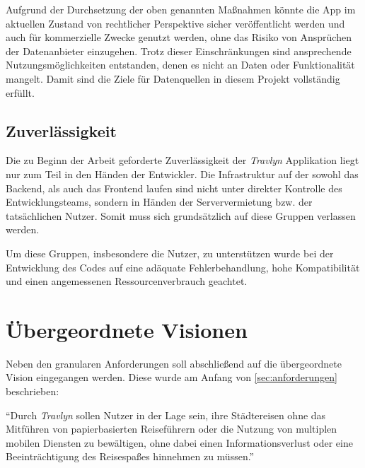 	\vspace{0.25cm}
	
	Aufgrund der Durchsetzung der oben genannten Maßnahmen könnte die App im aktuellen Zustand von rechtlicher Perspektive sicher veröffentlicht werden und auch für kommerzielle Zwecke genutzt werden, ohne das Risiko von Ansprüchen der Datenanbieter einzugehen. Trotz dieser Einschränkungen sind ansprechende Nutzungsmöglichkeiten entstanden, denen es nicht an Daten oder Funktionalität mangelt. Damit sind die Ziele für Datenquellen in diesem Projekt vollständig erfüllt.
	
	\subsection{Zuverlässigkeit}
	
	Die zu Beginn der Arbeit geforderte Zuverlässigkeit der \textit{Travlyn} Applikation liegt nur zum Teil in den Händen der Entwickler. Die Infrastruktur auf der sowohl das Backend, als auch das Frontend laufen sind nicht unter direkter Kontrolle des Entwicklungsteams, sondern in Händen der Serververmietung bzw. der tatsächlichen Nutzer. Somit muss sich grundsätzlich auf diese Gruppen verlassen werden.
	
	\vspace{0.25cm}
	
	Um diese Gruppen, insbesondere die Nutzer, zu unterstützen wurde bei der Entwicklung des Codes auf eine adäquate Fehlerbehandlung, hohe Kompatibilität und einen angemessenen Ressourcenverbrauch geachtet.
	
	\section{Übergeordnete Visionen}
	
	Neben den granularen Anforderungen soll abschließend auf die übergeordnete Vision eingegangen werden. Diese wurde am Anfang von \autoref{sec:anforderungen} beschrieben:
	
	\vspace{0.25cm}
	
	\enquote{Durch \textit{Travlyn} sollen Nutzer in der Lage sein, ihre Städtereisen ohne das Mitführen von papierbasierten Reiseführern oder die Nutzung von multiplen mobilen Diensten zu bewältigen, ohne dabei einen Informationsverlust oder eine Beeinträchtigung des Reisespaßes hinnehmen zu müssen.}
	
	\vspace{0.25cm}   